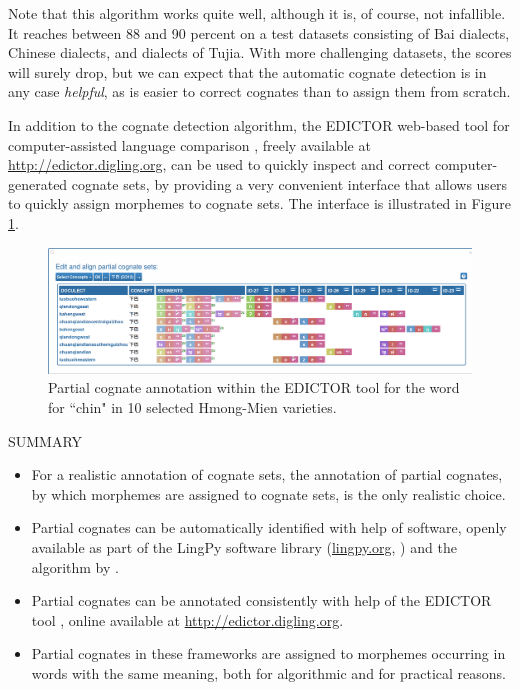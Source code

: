 \documentclass[xetex,svgnames]{scrartcl}
\begin{document}
Note that this algorithm works quite well, although it is, of course, not infallible. It reaches
between 88 and 90 percent on a test datasets consisting of Bai dialects, Chinese dialects, and
dialects of Tujia. With more challenging datasets, the scores will surely drop, but we can expect
that the automatic cognate detection is in any case \emph{helpful}, as is easier to correct cognates
than to assign them from scratch.

In addition to the cognate detection algorithm, the EDICTOR web-based tool for computer-assisted
language comparison \citep{List2017d}, freely available at \url{http://edictor.digling.org}, can be
used to quickly inspect and correct computer-generated cognate sets, by providing a very convenient
interface that allows users to quickly assign morphemes to cognate sets. The interface is
illustrated in Figure \ref{fig:edipart}.

\begin{figure}
  \centering
  \includegraphics[width=\textwidth]{partial-cognates.png}
  \caption{Partial cognate annotation within the EDICTOR tool for the word for ``chin" in 10
  selected Hmong-Mien varieties.}
  \label{fig:edipart}
\end{figure}

\begin{center}
  \hline
  SUMMARY \\\hline
  \begin{itemize}
    \item For a realistic annotation of cognate sets, the annotation of partial cognates, by which
      morphemes are assigned to cognate sets, is the only realistic choice.
    \item Partial cognates can be automatically identified with help of software, openly available
      as part of the LingPy software library (\url{lingpy.org}, \citealt{List2018i}) and the
      algorithm by \citet{List2016g}.
    \item Partial cognates can be annotated consistently with help of the EDICTOR tool
      \citep{List2017d}, online available at \url{http://edictor.digling.org}.
    \item Partial cognates in these frameworks are assigned to morphemes occurring in words with the
      same meaning, both for algorithmic and for practical reasons.
  \end{itemize}\\\hline
  \endtabular
\end{center}
\end{document}
